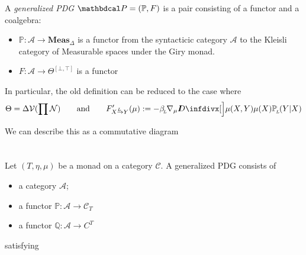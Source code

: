 \documentclass{article}
\begin{document}
	\begin{defn}
		A \emph{generalized PDG} $\dg P = (\mathbb P, F)$ is a pair consisting of a functor and a coalgebra:
		\begin{itemize}
			\item $\mathbb P : \mathcal A \to \mathbf{Meas}_{\Delta}$ is a functor from the syntacticic category $\mathcal A$ to the Kleisli category of Measurable spaces under the Giry monad.
			\item $F : \mathcal A \to \Theta^{[\bot,\top]}$ is a functor
		\end{itemize}
	\end{defn}

	In particular, the old definition can be reduced to the case where
	\[ 
		\Theta = \Delta\V(\prod \N)
			\qquad\text{and}\qquad 
		F'_{\ed LXY}(\mu) := - \beta\ssub L \nabla_\mu \kldiv[\Big]{\mu(X,Y)}{\mu(X) \mathbb P\ssub L(Y|X) }
	\]

	We can describe this as a commutative diagram
	\begin{center}
\end{center}

\clearpage

\section{}
Let $(T, \eta, \mu)$ be a monad on a category $\mathcal C$. 
A generalized PDG consists of
\begin{itemize}[nosep]
	\item a category $\mathcal A$;
	\item a functor $\mathbb P : \mathcal A \to \mathcal C_{T}$
	\item a functor $\mathbb Q : \mathcal A \to C^T$
\end{itemize}

satisfying

\end{document}
